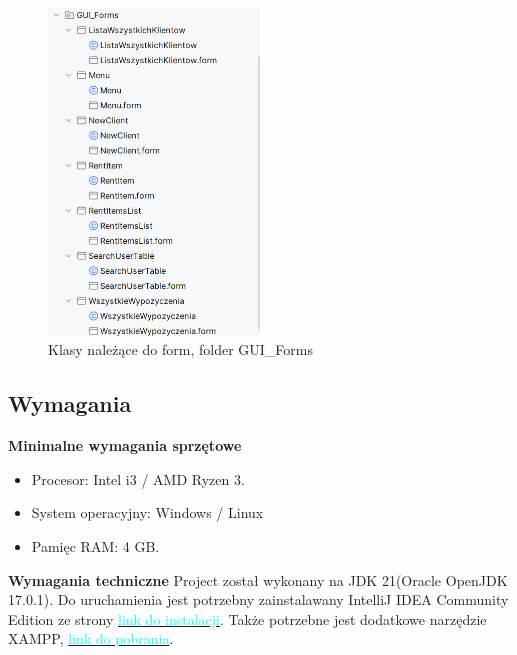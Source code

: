 \begin{figure}[h]
    \centering
    \includegraphics[width=0.5\textwidth]{figures/klasy_forms.jpg}
    \caption{Klasy należące do form, folder GUI\_Forms}
\end{figure}



\subsection{Wymagania}
\textbf{Minimalne wymagania sprzętowe}
\begin{itemize}
    \item Procesor: Intel i3 / AMD Ryzen 3.
    \item System operacyjny: Windows / Linux
    \item Pamięc RAM: 4 GB.
\end{itemize}

\textbf{Wymagania techniczne}
\newline
Project został wykonany na JDK 21(Oracle OpenJDK 17.0.1). Do uruchamienia jest potrzebny zainstalawany IntelliJ IDEA Community Edition ze strony 
\href{https://www.jetbrains.com/idea/download/?section=windows}{\textcolor{cyan}{link do instalacji}}.
Także potrzebne jest dodatkowe narzędzie XAMPP, \href{https://www.apachefriends.org/download.html}{\textcolor{cyan}{ link do pobrania}}.

\newpage
